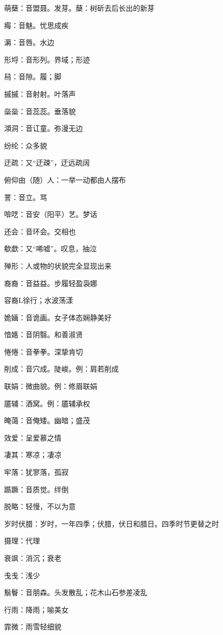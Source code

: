 萌蘖：音盟聂。发芽。蘖：树斫去后长出的新芽

痗：音魅。忧思成疾

漘：音唇。水边

形埒：音形列。界域；形迹

舄：音隙。履；脚

摵摵：音射射。叶落声

橤橤：音蕊蕊。垂落貌

澒洞：音讧童。弥漫无边

纷纶：众多貌

迂疏：又“迂疎”，迂远疏阔

俯仰由（随）人：一举一动都由人摆布

詈：音立。骂

啽呓：音安（阳平）艺。梦话

还会：音环会。交相也

欷歔：又“唏嘘”。叹息，抽泣

殚形：人或物的状貌完全显现出来

裔裔：音益益。步履轻盈袅娜

容裔L徐行；水波荡漾

姽婳：音诡画。女子体态娴静美好

愔嫕：音阴翳。和善淑贤

惓惓：音拳拳。深挚肯切

削成：音穴成。陡峻。例：肩若削成

联娟：微曲貌。例：修眉联娟

靥辅：酒窝。例：靥辅承权

晻蔼：音俺矮。幽暗；盛茂

效爱：呈爱慕之情

凄其：寒凉；凄凉

牢落：犹寥落，孤寂

踬蹶：音质觉。绊倒

脱略：轻慢，不以为意

岁时伏腊：岁时，一年四季；伏腊，伏日和腊日。四季时节更替之时

摄理：代理

衰飒：消沉；衰老

戋戋：浅少

鬅鬙：音朋森。头发散乱；花木山石参差凌乱

行雨：降雨；喻美女

霏微：雨雪轻细貌

\newpage
